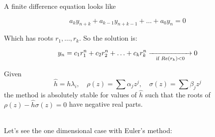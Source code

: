 \newpage

A finite difference equation looks like

\[
  a_ky_{n+k} + a_{k-1}y_{n+k-1} + \ldots + a_0y_n = 0
\]

Which has roots $r_1,\ldots,r_k$. So the solution is:

\[
  y_n = c_1r_1^n + c_2r_2^n + \ldots + c_kr_k^n \underset{\text{if } Re(r_k)<0}{\xrightarrow{\hspace*{2cm}}} 0
\]

\begin{prop}
    Given $$\hat{h} = h\lambda_i, \quad \rho(z) = \sum\alpha_jz^j, \quad \sigma(z) = \sum\beta_jz^j$$
    the method is absolutely stable for values of $\hat{h}$ such that the roots of $\rho(z) - \hat{h}\sigma(z) = 0$ have negative real parts.
\end{prop}
\-\\
Let's see the one dimensional case with Euler's method:

\usetikzlibrary[patterns]


